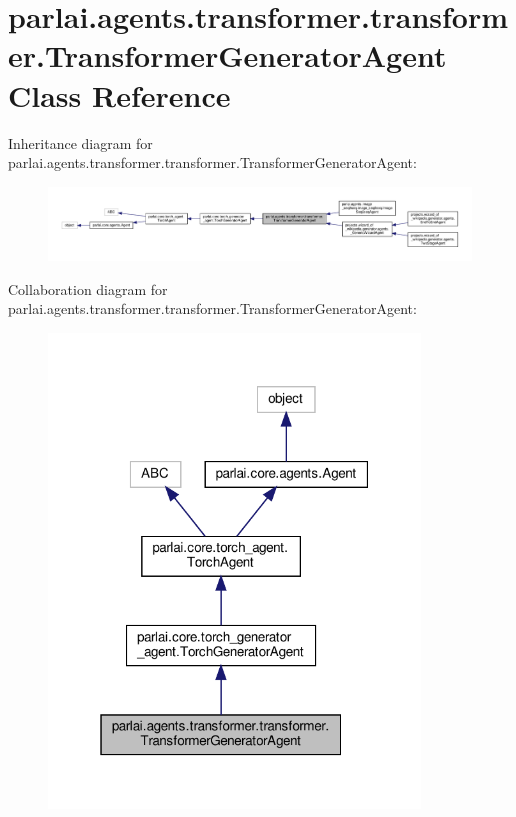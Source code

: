 \hypertarget{classparlai_1_1agents_1_1transformer_1_1transformer_1_1TransformerGeneratorAgent}{}\section{parlai.\+agents.\+transformer.\+transformer.\+Transformer\+Generator\+Agent Class Reference}
\label{classparlai_1_1agents_1_1transformer_1_1transformer_1_1TransformerGeneratorAgent}


Inheritance diagram for parlai.\+agents.\+transformer.\+transformer.\+Transformer\+Generator\+Agent\+:
\nopagebreak
\begin{figure}[H]
\begin{center}
\leavevmode
\includegraphics[width=350pt]{da/db6/classparlai_1_1agents_1_1transformer_1_1transformer_1_1TransformerGeneratorAgent__inherit__graph}
\end{center}
\end{figure}


Collaboration diagram for parlai.\+agents.\+transformer.\+transformer.\+Transformer\+Generator\+Agent\+:
\nopagebreak
\begin{figure}[H]
\begin{center}
\leavevmode
\includegraphics[width=280pt]{d9/d8e/classparlai_1_1agents_1_1transformer_1_1transformer_1_1TransformerGeneratorAgent__coll__graph}
\end{center}
\end{figure}

